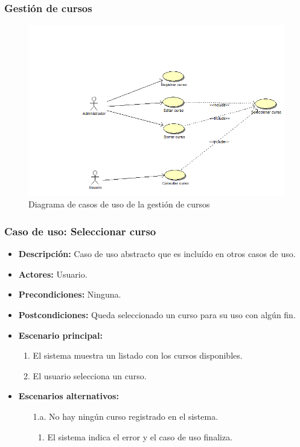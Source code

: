 \documentclass{book}
\begin{document}
\subsubsection{Gestión de cursos}
\begin{figure}[H] 
  \label{gestion-cursos} 
	\begin{center}
    \includegraphics[scale=0.5]{./gestioncursos.png}
  \end{center}
\caption{Diagrama de casos de uso de la gestión de cursos}
\end{figure}

\subsubsection*{Caso de uso: Seleccionar curso}
\begin{itemize}
\item{\bf Descripción:} Caso de uso abstracto que es incluído en otros casos de uso.
\item{\bf Actores:} Usuario.
\item{\bf Precondiciones:} Ninguna.
\item{\bf Postcondiciones:} Queda seleccionado un curso para su uso con algún fin.
\item{\bf Escenario principal:}
	\begin{enumerate}
	\item El sistema muestra un listado con los cursos disponibles.
        \item El usuario selecciona un curso.
	\end{enumerate}
\item{\bf Escenarios alternativos:}
	\begin{itemize}
	\item[1.a.]No hay ningún curso registrado en el sistema.
	  \begin{enumerate}
	  \item El sistema indica el error y el caso de uso finaliza.
	  \end{enumerate}
	\end{itemize}
\end{itemize}
\end{document}
